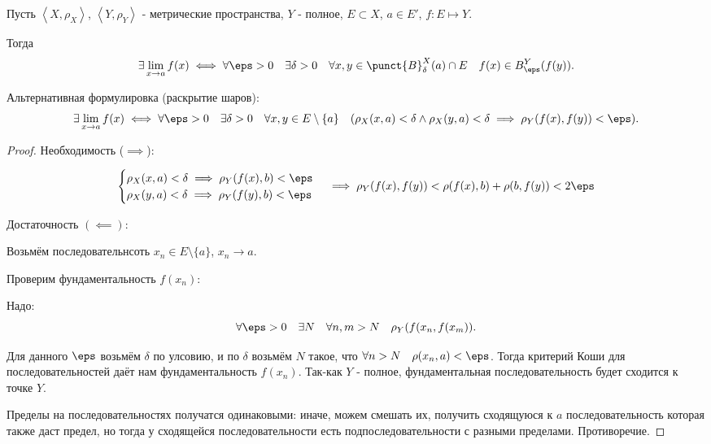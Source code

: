 \begin{theorem} \thmslashn

    
    Пусть $\left<X, \rho_{X}\right>$, $\left<Y, \rho_{Y}\right>$ - метрические пространства, $Y$ - полное, $E \subset X$, $a\in E'$, $f : E \mapsto Y$.
    
    Тогда
    \[ \exists\lim\limits_{x \to a} f(x) \iff \forall{\eps > 0}\quad \exists{\delta > 0}\quad \forall{x, y\in \punct{B}^{X}_{\delta}(a)\cap E}\quad f(x)\in B^{Y}_{\eps}(f(y))  . \]

    Альтернативная формулировка (раскрытие шаров):
    \[ \exists\lim\limits_{x \to a} f(x) \iff \forall{\eps > 0}\quad \exists{\delta > 0}\quad \forall{x, y\in E \setminus \{a\}}\quad (\rho_{X}(x, a) < \delta \land \rho_{X}(y, a) < \delta \implies \rho_{Y}(f(x), f(y)) < \eps) . \]
    \begin{proof} \thmslashn
    
        Необходимость ($\implies$):

        \begin{equation*}
            \begin{cases}
                \rho_{X}(x, a) < \delta \implies \rho_{Y}(f(x), b) < \eps\\
                \rho_{X}(y, a) < \delta \implies \rho_{Y}(f(y), b) < \eps
            \end{cases} \implies \rho_{Y}(f(x), f(y)) < \rho(f(x), b) + \rho(b, f(y)) < 2\eps
        \end{equation*}

        Достаточность $(\impliedby)$:

        Возьмём последовательнсоть $x_{n}\in E \setminus \{a\}$, $x_{n} \to a$.

        Проверим фундаментальность $f(x_{n})$:

        Надо:
        \[ \forall{\eps > 0}\quad \exists{N}\quad \forall{n, m > N}\quad \rho_{Y}(f(x_{n}, f(x_{m})) .\]

        Для данного $\eps$ возьмём $\delta$ по улсовию, и по $\delta$ возьмём $N$ такое, что $\forall{n > N}\quad \rho(x_{n}, a) < \eps$. Тогда критерий Коши для последовательностей даёт нам фундаментальность $f(x_{n})$. Так-как $Y$ - полное, фундаментальная последовательность будет сходится к точке $Y$.

        Пределы на последовательностях получатся одинаковыми: иначе, можем смешать их, получить сходящуюся к $a$ последовательность которая также даст предел, но тогда у сходящейся последовательности есть подпоследовательности с разными пределами. Противоречие.
    \end{proof}
\end{theorem}
